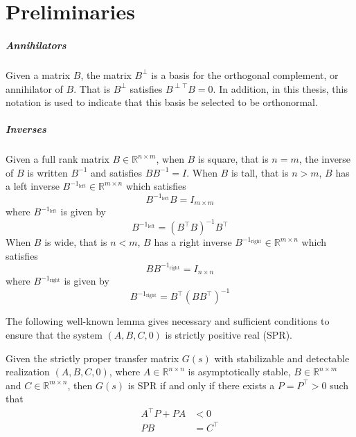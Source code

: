 \chapter{Preliminaries}\label{app.preliminaries}

\paragraph{Annihilators} 
Given a matrix $B$, the matrix $B^{\perp}$ is a basis for the orthogonal complement, or annihilator of $B$.
That is $B^{\perp}$ satisfies $B^{\perp\top}B=0$.
In addition, in this thesis, this notation is used to indicate that this basis be selected to be orthonormal.

\paragraph{Inverses}
Given a full rank matrix $B\in\mathbb{R}^{n\times m}$, when $B$ is square, that is $n=m$, the inverse of $B$ is written $B^{-1}$ and satisfies $BB^{-1}=I$.
When $B$ is tall, that is $n>m$, $B$ has a left inverse $B^{-1_{\text{left}}}\in\mathbb{R}^{m\times n}$ which satisfies
\begin{equation}
  B^{-1_{\text{left}}}B = I_{m\times m}
\end{equation}
where $B^{-1_{\text{left}}}$ is given by
\begin{equation}
  B^{-1_{\text{left}}} = (B^{\top}B)^{-1}B^{\top}
\end{equation}
When $B$ is wide, that is $n<m$, $B$ has a right inverse $B^{-1_{\text{right}}}\in\mathbb{R}^{m\times n}$ which satisfies
\begin{equation}
  BB^{-1_{\text{right}}} = I_{n\times n}
\end{equation}
where $B^{-1_{\text{right}}}$ is given by
\begin{equation}
  B^{-1_{\text{right}}} = B^{\top}(BB^{\top})^{-1}
\end{equation}

The following well-known lemma gives necessary and sufficient conditions to ensure that the system $(A,B,C,0)$ is strictly positive real (SPR).

\begin{lem-dan}\label{lem.KY}
  Given the strictly proper transfer matrix $G(s)$ with stabilizable and detectable realization $(A,B,C,0)$, where $A\in\mathbb{R}^{n\times n}$ is asymptotically stable, $B\in\mathbb{R}^{n\times m}$ and $C\in\mathbb{R}^{m\times n}$, then $G(s)$ is SPR if and only if there exists a $P=P^{\top}>0$ such that
  \begin{align}
    \label{eqn.lyapal2}
    A^{\top}P+PA&<0 \\
    \label{eqn.pbc}
    PB&=C^{\top}
  \end{align} 
\end{lem-dan}

